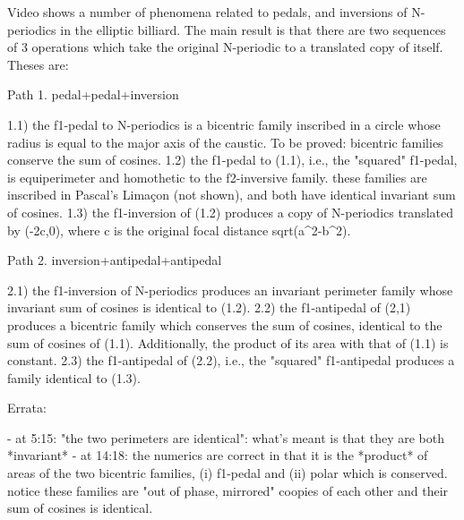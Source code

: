 Video shows a number of phenomena related to pedals, and inversions of N-periodics in the elliptic billiard. The main result is that there are two sequences of 3 operations which take the original N-periodic to a translated copy of itself. Theses are:

Path 1. pedal+pedal+inversion

1.1) the f1-pedal to N-periodics is a bicentric family inscribed in a circle whose radius is equal to the major axis of the caustic. To be proved: bicentric families conserve the sum of cosines.
1.2) the f1-pedal to (1.1), i.e., the "squared" f1-pedal, is equiperimeter and homothetic to the f2-inversive family. these families are inscribed in Pascal's Limaçon (not shown), and both have identical invariant sum of cosines.
1.3) the f1-inversion of (1.2) produces a copy of N-periodics translated by (-2c,0), where c is the original focal distance sqrt(a^2-b^2).

Path 2. inversion+antipedal+antipedal

2.1) the f1-inversion of N-periodics produces an invariant perimeter family whose invariant sum of cosines is identical to (1.2).
2.2) the f1-antipedal of (2,1) produces a bicentric family which conserves the sum of cosines, identical to the sum of cosines of (1.1). Additionally, the product of its area with that of (1.1) is constant.
2.3) the f1-antipedal of (2.2), i.e., the "squared" f1-antipedal produces a family identical to (1.3).

Errata:

- at 5:15: "the two perimeters are identical": what's meant is that they are both *invariant*
- at 14:18: the numerics are correct in that it is the *product* of areas of the two bicentric families, (i) f1-pedal and (ii) polar which is conserved. notice these families are "out of phase, mirrored" coopies of each other and their sum of cosines is identical.